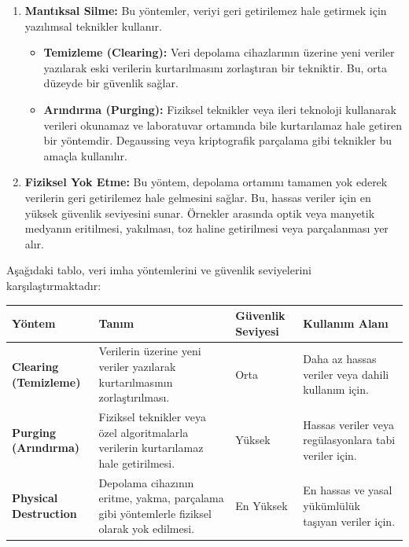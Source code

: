\begin{enumerate}
    \item \textbf{Mantıksal Silme:} Bu yöntemler, veriyi geri getirilemez hale getirmek için yazılımsal teknikler kullanır.
    \begin{itemize}
        \item \textbf{Temizleme (Clearing):} Veri depolama cihazlarının üzerine yeni veriler yazılarak eski verilerin kurtarılmasını zorlaştıran bir tekniktir. Bu, orta düzeyde bir güvenlik sağlar.
        \item \textbf{Arındırma (Purging):} Fiziksel teknikler veya ileri teknoloji kullanarak verileri okunamaz ve laboratuvar ortamında bile kurtarılamaz hale getiren bir yöntemdir. Degaussing veya kriptografik parçalama gibi teknikler bu amaçla kullanılır.
    \end{itemize}
    \item \textbf{Fiziksel Yok Etme:} Bu yöntem, depolama ortamını tamamen yok ederek verilerin geri getirilemez hale gelmesini sağlar. Bu, hassas veriler için en yüksek güvenlik seviyesini sunar. Örnekler arasında optik veya manyetik medyanın eritilmesi, yakılması, toz haline getirilmesi veya parçalanması yer alır.
\end{enumerate}

Aşağıdaki tablo, veri imha yöntemlerini ve güvenlik seviyelerini karşılaştırmaktadır:

\begin{center}
\begin{tabularx}{0.95\textwidth}{|>{\raggedright\arraybackslash}X|>{\centering\arraybackslash}X|>{\centering\arraybackslash}X|>{\centering\arraybackslash}X|}
\hline
\textbf{Yöntem} & \textbf{Tanım} & \textbf{Güvenlik Seviyesi} & \textbf{Kullanım Alanı} \\
\hline
\textbf{Clearing (Temizleme)} & Verilerin üzerine yeni veriler yazılarak kurtarılmasının zorlaştırılması. & Orta & Daha az hassas veriler veya dahili kullanım için. \\
\hline
\textbf{Purging (Arındırma)} & Fiziksel teknikler veya özel algoritmalarla verilerin kurtarılamaz hale getirilmesi. & Yüksek & Hassas veriler veya regülasyonlara tabi veriler için. \\
\hline
\textbf{Physical Destruction} & Depolama cihazının eritme, yakma, parçalama gibi yöntemlerle fiziksel olarak yok edilmesi. & En Yüksek & En hassas ve yasal yükümlülük taşıyan veriler için. \\
\hline
\end{tabularx}
\end{center}

